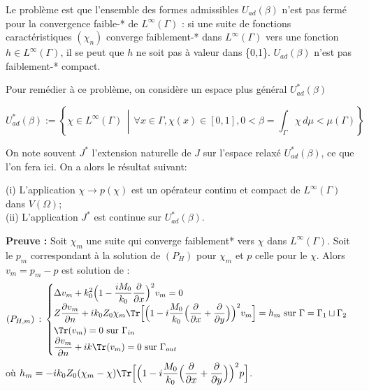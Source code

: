 Le problème est que l'ensemble des formes admissibles \(U_{ad}(\beta)\) n'est pas fermé pour la convergence faible-* de \(L^\infty(\Gamma)\) : si une suite de fonctions caractéristiques \((\chi_n)\) converge faiblement-* dans \(L^\infty(\Gamma)\) vers une fonction \(h \in L^\infty(\Gamma)\), il se peut que \(h\) ne soit pas à valeur dans \{0,1\}. \(U_{ad}(\beta)\) n'est pas faiblement-* compact.


Pour remédier à ce problème, on considère un espace plus général  $U_{ad}^*(\beta)$ 


\[ U_{ad}^*(\beta) := \left\{\chi \in L^{\infty}(\Gamma) \, \middle| \, \forall x \in \Gamma, \chi(x) \in [0,1], 0 < \beta = \int_{\Gamma} \chi \, d\mu < \mu(\Gamma)\right\} \]

On note souvent $J^*$ l'extension naturelle de $J$ sur l'espace relaxé $U_{ad}^*(\beta)$, ce que l'on fera ici.
On a alors le résultat suivant:

\begin{tcolorbox}[colback=green!5!white,colframe=green!75!black,title=Théorème 5.1.1: Continuité de l'énergie]

(i) L'application $\chi\longrightarrow p(\chi)$ est un opérateur continu et compact de $L^\infty(\Gamma)$ dans $V(\Omega)$;\\

(ii) L'application $J^*$ est continue sur $U_{ad}^*(\beta)$.

\end{tcolorbox}

\textbf{Preuve :} Soit $\chi_m$ une suite qui converge faiblement* vers $\chi$ dans $L^{\infty}(\Gamma)$. Soit le $p_m$ correspondant à la solution de $(P_H)$ pour $\chi_m$ et $p$ celle pour le $\chi$. Alors $v_m = p_m - p $ est solution de :
\[
    (P_{H,m}) \hspace{2pt} : \hspace{2pt}
    \begin{cases}
    \displaystyle \Delta v_m + k_0^2\Big(1 - \frac{iM_0}{k_0}\frac{\partial}{\partial x}\Big)^2v_m = 0 \\
    \displaystyle Z\frac{\partial v_m}{\partial n} + ik_0Z_0\chi_m \Tr \Bigl[ \Bigl(1-i \frac{M_0}{k_0} \Big(\frac{\partial}{\partial x} + \frac{\partial}{\partial y}\Big) \Bigr)^2v_m \Bigr] = h_m \text{ sur } \Gamma = \Gamma_1 \sqcup \Gamma_2
    \\
    \displaystyle \Tr(v_m) = 0 \text{ sur } \Gamma_{in} \\
    \displaystyle \frac{\partial v_m}{\partial n} + ik \Tr(v_m) = 0 \text{ sur } \Gamma_{out}
    \end{cases} 
\]
où $h_m = \displaystyle - ik_0Z_0(\chi_m - \chi)\Tr \Bigl[ \Bigl(1-i \frac{M_0}{k_0} \Big(\frac{\partial}{\partial x} + \frac{\partial}{\partial y}\Big) \Bigr)^2p \Bigr]$.\\

